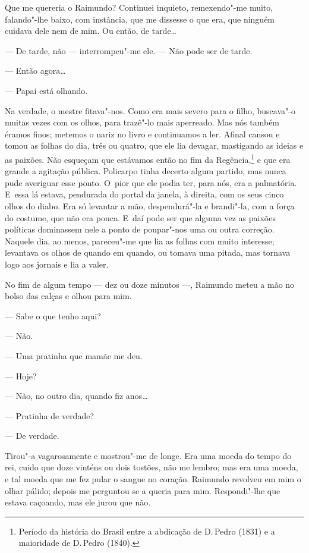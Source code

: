 \begin{linenumbers}
Que me quereria o Raimundo? Continuei inquieto, remexendo"-me muito,
falando"-lhe baixo, com instância, que me dissesse o que era, que ninguém
cuidava dele nem de mim. Ou então, de tarde\ldots{}

--- De tarde, não --- interrompeu"-me ele. --- Não pode ser de tarde.

--- Então agora\ldots{}

--- Papai está olhando.

Na verdade, o mestre fitava"-nos. Como era mais severo para o filho,
buscava"-o muitas vezes com os olhos, para trazê"-lo mais aperreado. Mas
nós também éramos finos; metemos o nariz no livro e continuamos a ler.
Afinal cansou e tomou as folhas do dia, três ou quatro, que ele lia
devagar, mastigando as ideias e as paixões. Não esqueçam que estávamos
então no fim da Regência,\footnote{Período da história do Brasil entre a
  abdicação de D.\,Pedro  (1831) e a maioridade de D.\,Pedro  (1840).}
e que era grande a agitação pública. Policarpo tinha decerto algum
partido, mas nunca pude averiguar esse ponto. O~pior que ele podia ter,
para nós, era a palmatória. E~essa lá estava, pendurada do portal da
janela, à direita, com os seus cinco olhos do diabo. Era só levantar a
mão, despendurá"-la e brandi"-la, com a força do costume, que não era
pouca. E~daí pode ser que alguma vez as paixões políticas dominassem
nele a ponto de poupar"-nos uma ou outra correção. Naquele dia, ao menos,
pareceu"-me que lia as folhas com muito interesse; levantava os olhos de
quando em quando, ou tomava uma pitada, mas tornava logo aos jornais e
lia a valer.

No fim de algum tempo --- dez ou doze minutos ---, Raimundo meteu a mão no
bolso das calças e olhou para mim.

--- Sabe o que tenho aqui?

--- Não.

--- Uma pratinha que mamãe me deu.

--- Hoje?

--- Não, no outro dia, quando fiz anos\ldots{}

--- Pratinha de verdade?

--- De verdade.

Tirou"-a vagarosamente e mostrou"-me de longe. Era uma moeda do tempo do
rei, cuido que doze vinténs ou dois tostões, não me lembro; mas era uma
moeda, e tal moeda que me fez pular o sangue no coração. Raimundo
revolveu em mim o olhar pálido; depois me perguntou se a queria para
mim. Respondi"-lhe que estava caçoando, mas ele jurou que não.


\end{linenumbers}
